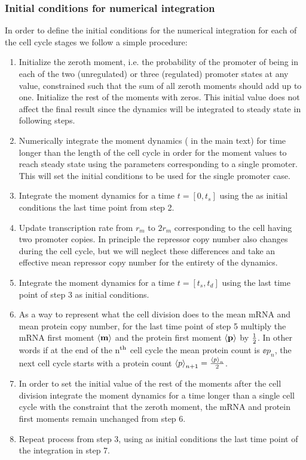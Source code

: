 \subsubsection{Initial conditions for numerical integration}

In order to define the initial conditions for the numerical integration for each
of the cell cycle stages we follow a simple procedure:
\begin{enumerate}
  \item Initialize the zeroth moment, i.e. the probability of the promoter of
  being in each of the two (unregulated) or three (regulated) promoter states at
  any value, constrained such that the sum of all zeroth moments should add up
  to one. Initialize the rest of the moments with zeros. This initial value does
  not affect the final result since the dynamics will be integrated to steady
  state in following steps.
  \item Numerically integrate the moment dynamics ( in the
  main text) for time longer than the length of the cell cycle in order for the
  moment values to reach steady state using the parameters corresponding to a
  single promoter. This will set the initial conditions to be used for the
  single promoter case.
  \item Integrate the moment dynamics for a time $t = [0, t_s]$ using the
  as initial conditions the last time point from step 2.
  \item Update transcription rate from $r_m$ to $2 r_m$ corresponding to the
  cell having two promoter copies. In principle the repressor copy number also
  changes during the cell cycle, but we will neglect these differences and take
  an effective mean repressor copy number for the entirety of the dynamics.
  \item Integrate the moment dynamics for a time $t = [t_s, t_d]$ using the
  last time point of step 3 as initial conditions.
  \item As a way to represent what the cell division does to the mean mRNA and
  mean protein copy number, for the last time point of step 5 multiply the mRNA
  first moment $\left\langle \mathbf{m} \right\rangle$ and the protein first moment $\left\langle \mathbf{p} \right\rangle$ by $1
  \over 2$. In other words if at the end of the n$^\text{th}$ cell cycle the mean
  protein count is $\ee{p}_n$, the next cell cycle starts with a protein count
  $\left\langle p \right\rangle_{n + 1} = {\left\langle p \right\rangle_n \over 2}$.
  \item In order to set the initial value of the rest of the moments after the
  cell division integrate the moment dynamics for a time longer than a single
  cell cycle with the constraint that the zeroth moment, the mRNA and protein
  first moments remain unchanged from step 6.
  \item Repeat process from step 3, using as initial conditions the last time
  point of the integration in step 7.
\end{enumerate}

